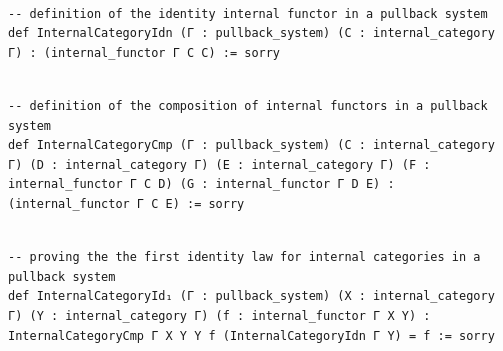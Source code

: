\documentclass{book}
\theoremstyle{definition}
\newcounter{lcounter}
\begin{document}
\begin{center}
\begin{tcolorbox}[width=5in,colback={white},title={\begin{center}\texttt{Lean \thelcounter} \addtocounter{lcounter}{1}  \end{center}},colbacktitle=Blue,coltitle=black]
\begin{verbatim}

-- definition of the identity internal functor in a pullback system
def InternalCategoryIdn (Γ : pullback_system) (C : internal_category Γ) : (internal_functor Γ C C) := sorry

\end{verbatim}
\end{tcolorbox}
\end{center}

\begin{center}
\begin{tcolorbox}[width=5in,colback={white},title={\begin{center}\texttt{Lean \thelcounter} \addtocounter{lcounter}{1}  \end{center}},colbacktitle=Blue,coltitle=black]
\begin{verbatim}

-- definition of the composition of internal functors in a pullback system
def InternalCategoryCmp (Γ : pullback_system) (C : internal_category Γ) (D : internal_category Γ) (E : internal_category Γ) (F : internal_functor Γ C D) (G : internal_functor Γ D E) : (internal_functor Γ C E) := sorry

\end{verbatim}
\end{tcolorbox}
\end{center}

\begin{center}
\begin{tcolorbox}[width=5in,colback={white},title={\begin{center}\texttt{Lean \thelcounter} \addtocounter{lcounter}{1}  \end{center}},colbacktitle=Blue,coltitle=black]
\begin{verbatim}

-- proving the the first identity law for internal categories in a pullback system
def InternalCategoryId₁ (Γ : pullback_system) (X : internal_category Γ) (Y : internal_category Γ) (f : internal_functor Γ X Y) : InternalCategoryCmp Γ X Y Y f (InternalCategoryIdn Γ Y) = f := sorry

\end{verbatim}
\end{tcolorbox}
\end{center}
\end{document}
